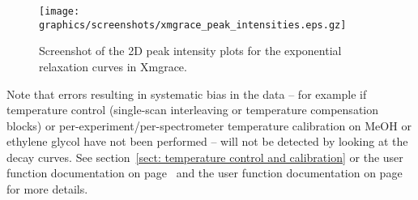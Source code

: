 \begin{figure}
\centerline{\texttt{[image: graphics/screenshots/xmgrace\_peak\_intensities.eps.gz]}}
\caption[Peak intensity 2D plot xmgrace screenshot]{Screenshot of the 2D peak intensity plots for the exponential relaxation curves in Xmgrace.}\label{fig: screenshot: xmgrace peak intensities}
\end{figure}

Note that errors resulting in systematic bias in the data -- for example if temperature control (single-scan interleaving or temperature compensation blocks) or per-experiment/per-spectrometer temperature calibration on MeOH or ethylene glycol have not been performed -- will not be detected by looking at the decay curves.  See section~\ref{sect: temperature control and calibration} or the  user function documentation on page~\pageref{uf: relax_data.temp_calibration} and the  user function documentation on page~\pageref{uf: relax_data.temp_control} for more details.
